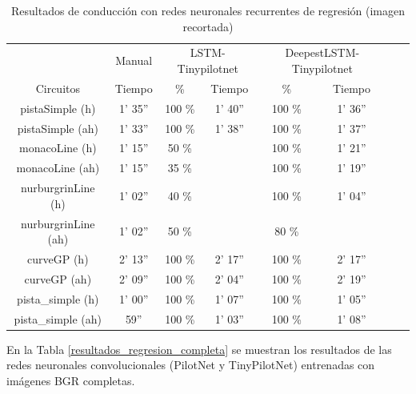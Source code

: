 \begin{table}[H]
\centering
\caption{Resultados de conducción con redes neuronales recurrentes de regresión (imagen recortada)}
\label{resultados_regresion_recurrente_recortada}
\begin{tabular}{c|c|c|c|c|c|c|c|}
\cline{2-6}
                          & \multicolumn{1}{c|}{Manual} & \multicolumn{2}{c|}{LSTM-Tinypilotnet} & \multicolumn{2}{c|}{DeepestLSTM-Tinypilotnet} \\ \cline{1-6} 
                        \multicolumn{1}{|c|}{Circuitos}    & Tiempo       & \%       & Tiempo       & \%        & Tiempo      \\ \hline
\multicolumn{1}{|c|}{pistaSimple (h)}    & 1' 35''     &  100 \%   & 1' 40''    & 100 \%   & 1' 36''        \\ \hline
\multicolumn{1}{|c|}{pistaSimple (ah)}     & 1' 33''    & 100 \%    & 1' 38''   & 100 \%      & 1' 37''  \\ \hline
\multicolumn{1}{|c|}{monacoLine (h)}      & 1' 15''     & 50 \%       &     & 100 \%      & 1' 21''            \\ \hline
\multicolumn{1}{|c|}{monacoLine (ah)}       & 1' 15''     & 35 \%      &      & 100 \%        & 1' 19''         \\ \hline
\multicolumn{1}{|c|}{nurburgrinLine (h)}      & 1' 02''   & 40 \%    &       & 100 \%      & 1' 04''         \\ \hline
\multicolumn{1}{|c|}{nurburgrinLine (ah)}       & 1' 02''    & 50 \%     &        &  80 \%    &          \\ \hline
\multicolumn{1}{|c|}{curveGP (h)}     & 2' 13''     & 100 \%     & 2' 17''    &  100 \%     & 2' 17''             \\ \hline
\multicolumn{1}{|c|}{curveGP (ah)}       & 2' 09''   & 100 \%    & 2' 04''     &  100 \%      & 2' 19''      \\ \hline
\multicolumn{1}{|c|}{pista\_simple (h)}       & 1' 00''       & 100 \%       & 1' 07''  &  100 \%     & 1' 05''    \\ \hline
\multicolumn{1}{|c|}{pista\_simple (ah)}     & 59''    & 100 \%    & 1' 03''      &  100 \%     & 1' 08''         \\ \hline
\end{tabular}
\end{table}


En la Tabla \ref{resultados_regresion_completa} se muestran los resultados de las redes neuronales convolucionales (PilotNet y TinyPilotNet) entrenadas con imágenes BGR completas. \\

